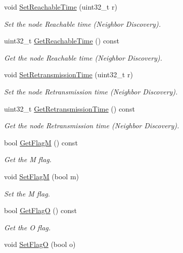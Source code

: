 \begin{DoxyCompactItemize}
void \hyperlink{classns3_1_1Icmpv6RA_a66568d3ab181bd0c187d634d78d91c24}{Set\+Reachable\+Time} (uint32\+\_\+t r)
\begin{DoxyCompactList}\small\item\em Set the node Reachable time (Neighbor Discovery). \end{DoxyCompactList}\item 
uint32\+\_\+t \hyperlink{classns3_1_1Icmpv6RA_ad9a6f8b78073b3573880384bf1e84af7}{Get\+Reachable\+Time} () const 
\begin{DoxyCompactList}\small\item\em Get the node Reachable time (Neighbor Discovery). \end{DoxyCompactList}\item 
void \hyperlink{classns3_1_1Icmpv6RA_a4d725d41eded89e8f40f781412adac8a}{Set\+Retransmission\+Time} (uint32\+\_\+t r)
\begin{DoxyCompactList}\small\item\em Set the node Retransmission time (Neighbor Discovery). \end{DoxyCompactList}\item 
uint32\+\_\+t \hyperlink{classns3_1_1Icmpv6RA_aef44b3dec436b433cb092358b805b6ce}{Get\+Retransmission\+Time} () const 
\begin{DoxyCompactList}\small\item\em Get the node Retransmission time (Neighbor Discovery). \end{DoxyCompactList}\item 
bool \hyperlink{classns3_1_1Icmpv6RA_a31c9298de92046491bc8038f66a937ff}{Get\+FlagM} () const 
\begin{DoxyCompactList}\small\item\em Get the M flag. \end{DoxyCompactList}\item 
void \hyperlink{classns3_1_1Icmpv6RA_a60e350a958ac8ddf084ef82120dbdf82}{Set\+FlagM} (bool m)
\begin{DoxyCompactList}\small\item\em Set the M flag. \end{DoxyCompactList}\item 
bool \hyperlink{classns3_1_1Icmpv6RA_abac75a0e70064278f3692691ea0a21fe}{Get\+FlagO} () const 
\begin{DoxyCompactList}\small\item\em Get the O flag. \end{DoxyCompactList}\item 
void \hyperlink{classns3_1_1Icmpv6RA_a5af84e63d720d64e1a43727ecba29f77}{Set\+FlagO} (bool o)

\end{DoxyCompactItemize}
